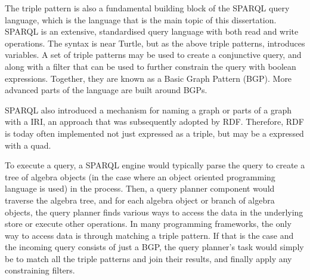 The triple pattern is also a fundamental building block of the SPARQL
query language, which is the language that is the main topic of this
dissertation. SPARQL is an extensive, standardised query language with
both read and write operations. The syntax is near Turtle, but as the
above triple patterns, introduces variables. A set of triple patterns
may be used to create a conjunctive query, and along with a filter
that can be used to further constrain the query with boolean
expressions. Together, they are known as a Basic Graph Pattern
(BGP). More advanced parts of the language are built around BGPs.

SPARQL also introduced a mechanism for naming a graph or parts of a
graph with a IRI, an approach that was subsequently adopted by
RDF. Therefore, RDF is today often implemented not just expressed as
a triple, but may be a expressed with a quad.

To execute a query, a SPARQL engine would typically parse the query to
create a tree of algebra objects (in the case where an object oriented
programming language is used) in the process. Then, a query planner
component would traverse the algebra tree, and for each algebra object
or branch of algebra objects, the query planner finds various ways to
access the data in the underlying store or execute other
operations. In many programming frameworks, the only way to access
data is through matching a triple pattern. If that is the case and
the incoming query consists of just a BGP, the query planner's task
would simply be to match all the triple patterns and join their
results, and finally apply any constraining filters. 

